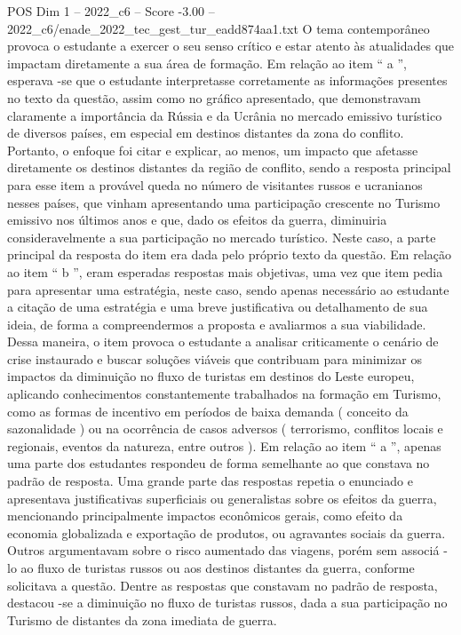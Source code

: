 \begin{textsample}{POS Dim 1 – 2022\_c6 – Score -3.00 – 2022\_c6/enade\_2022\_tec\_gest\_tur\_eadd874aa1.txt}
O tema contemporâneo provoca o estudante a exercer o seu senso crítico e estar atento às atualidades que impactam diretamente a sua área de formação.
Em relação ao item “ a ”, esperava -se que o estudante interpretasse corretamente as informações presentes no texto da questão, assim como no gráfico apresentado, que demonstravam claramente a importância da Rússia e da Ucrânia no mercado emissivo turístico de diversos países, em especial em destinos distantes da zona do conflito.
Portanto, o enfoque foi citar e explicar, ao menos, um impacto que afetasse diretamente os destinos distantes da região de conflito, sendo a resposta principal para esse item a provável queda no número de visitantes russos e ucranianos nesses países, que vinham apresentando uma participação crescente no Turismo emissivo nos últimos anos e que, dado os efeitos da guerra, diminuiria consideravelmente a sua participação no mercado turístico.
Neste caso, a parte principal da resposta do item era dada pelo próprio texto da questão.
Em relação ao item “ b ”, eram esperadas respostas mais objetivas, uma vez que item pedia para apresentar uma estratégia, neste caso, sendo apenas necessário ao estudante a citação de uma estratégia e uma breve justificativa ou detalhamento de sua ideia, de forma a compreendermos a proposta e avaliarmos a sua viabilidade.
Dessa maneira, o item provoca o estudante a analisar criticamente o cenário de crise instaurado e buscar soluções viáveis que contribuam para minimizar os impactos da diminuição no fluxo de turistas em destinos do Leste europeu, aplicando conhecimentos constantemente trabalhados na formação em Turismo, como as formas de incentivo em períodos de baixa demanda ( conceito da sazonalidade ) ou na ocorrência de casos adversos ( terrorismo, conflitos locais e regionais, eventos da natureza, entre outros ).
Em relação ao item “ a ”, apenas uma parte dos estudantes respondeu de forma semelhante ao que constava no padrão de resposta.
Uma grande parte das respostas repetia o enunciado e apresentava justificativas superficiais ou generalistas sobre os efeitos da guerra, mencionando principalmente impactos econômicos gerais, como efeito da economia globalizada e exportação de produtos, ou agravantes sociais da guerra.
Outros argumentavam sobre o risco aumentado das viagens, porém sem associá -lo ao fluxo de turistas russos ou aos destinos distantes da guerra, conforme solicitava a questão.
Dentre as respostas que constavam no padrão de resposta, destacou -se a diminuição no fluxo de turistas russos, dada a sua participação no Turismo de distantes da zona imediata de guerra.

\end{textsample}
